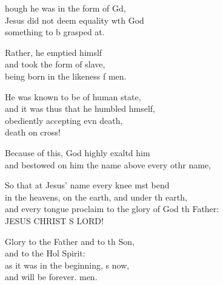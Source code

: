 \settowidth{\versewidth}{and every tongue proclaim to the glory of God the Father: *}
\begin{psalmverse}%
  \begin{patverse}
    hough he was in the form of Gd,\Flex\\
    Jesus did not deem equality w\pointup{\i}th God\Med\\
    something to b grasped at.
    
    Rather, he emptied himslf\Flex\\
    and took the form of  slave,\Med\\
    being born in the likeness f men.
    
    He was known to be of human state,\Med\\
    and it was thus that he humbled h\pointup{\i}mself,\\
    obediently accepting evn death,\Med\\
    death on  cross!
    
    Because of this, God highly exaltd him\Med\\
    and bestowed on him the name above every othr name,
    
    So that at Jesus’ name every knee mst bend\Med\\
    in the heavens, on the earth, and under th earth,\\
    and every tongue proclaim to the glory of God th Father:\Med\\
    JESUS CHRIST S LORD!

    Glory to the Father and to th Son,\Med\\
    and to the Hol Spirit:\\
    as it was in the beginning, \pointup{\i}s now,\Med\\
    and will be forever. men.
  \end{patverse}
\end{psalmverse}
